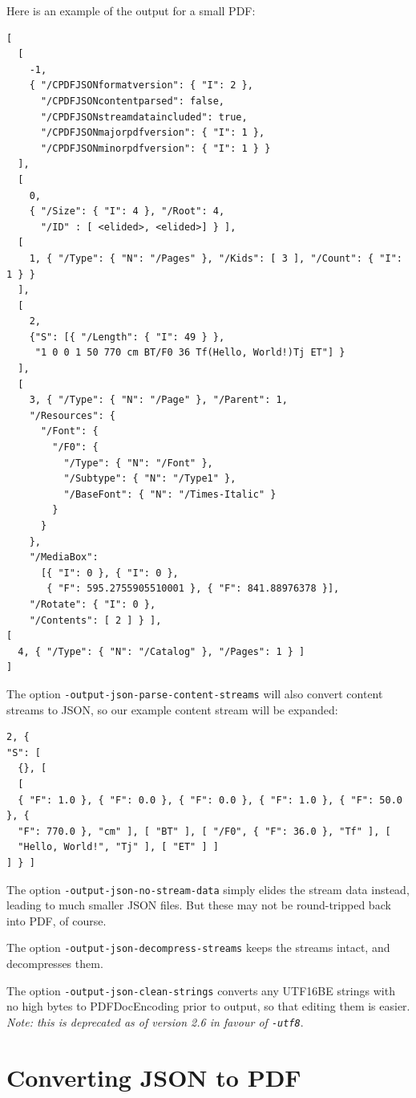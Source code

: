 \documentclass{book}
\begin{document}
\noindent Here is an example of the output for a small PDF:

{\small\begin{verbatim}
[
  [
    -1,
    { "/CPDFJSONformatversion": { "I": 2 },
      "/CPDFJSONcontentparsed": false,
      "/CPDFJSONstreamdataincluded": true,
      "/CPDFJSONmajorpdfversion": { "I": 1 },
      "/CPDFJSONminorpdfversion": { "I": 1 } }
  ],
  [
    0,
    { "/Size": { "I": 4 }, "/Root": 4,
      "/ID" : [ <elided>, <elided>] } ],
  [
    1, { "/Type": { "N": "/Pages" }, "/Kids": [ 3 ], "/Count": { "I": 1 } }
  ],
  [
    2,
    {"S": [{ "/Length": { "I": 49 } },
     "1 0 0 1 50 770 cm BT/F0 36 Tf(Hello, World!)Tj ET"] }
  ],
  [
    3, { "/Type": { "N": "/Page" }, "/Parent": 1,
    "/Resources": {
      "/Font": {
        "/F0": {
          "/Type": { "N": "/Font" },
          "/Subtype": { "N": "/Type1" },
          "/BaseFont": { "N": "/Times-Italic" }
        }
      }
    },
    "/MediaBox":
      [{ "I": 0 }, { "I": 0 },
       { "F": 595.2755905510001 }, { "F": 841.88976378 }],
    "/Rotate": { "I": 0 },
    "/Contents": [ 2 ] } ],
[
  4, { "/Type": { "N": "/Catalog" }, "/Pages": 1 } ]
]\end{verbatim}}

\noindent The option \texttt{-output-json-parse-content-streams} will also convert content streams to JSON, so our example content stream will be expanded:


{\small\begin{verbatim}
2, {
"S": [
  {}, [
  [
  { "F": 1.0 }, { "F": 0.0 }, { "F": 0.0 }, { "F": 1.0 }, { "F": 50.0 }, {
  "F": 770.0 }, "cm" ], [ "BT" ], [ "/F0", { "F": 36.0 }, "Tf" ], [
  "Hello, World!", "Tj" ], [ "ET" ] ]
] } ]
\end{verbatim}}

\noindent The option \texttt{-output-json-no-stream-data} simply elides the stream data instead, leading to much smaller JSON files. But these may not be round-tripped back into PDF, of course.

The option \texttt{-output-json-decompress-streams} keeps the streams intact, and decompresses them.

The option \texttt{-output-json-clean-strings} converts any UTF16BE strings with no high bytes to PDFDocEncoding prior to output, so that editing them is easier. \textit{Note: this is deprecated as of version 2.6 in favour of \texttt{\textup{-utf8}}}.

\section{Converting JSON to PDF}
\end{document}
